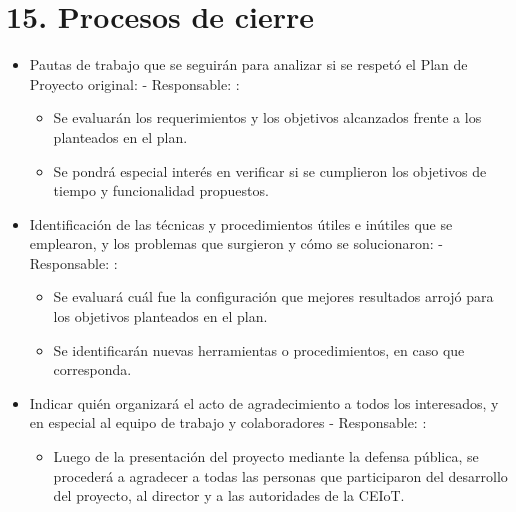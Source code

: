 \documentclass[
11pt, %
]{charter}
\begin{document}
\section{15. Procesos de cierre} 
\label{sec:cierre}

\begin{itemize}
	\item Pautas de trabajo que se seguirán para analizar si se respetó el Plan de Proyecto original:
	 - Responsable: \authorname:
	\begin{itemize}			
		\item Se evaluarán los requerimientos y los objetivos alcanzados frente a los planteados en el plan.
		\item Se pondrá especial interés en verificar si se cumplieron los objetivos de tiempo y funcionalidad propuestos.
	\end{itemize}	    	
	
	\item Identificación de las técnicas y procedimientos útiles e inútiles que se emplearon, y los problemas que surgieron y cómo se solucionaron:
	 - Responsable: \authorname:
	\begin{itemize}			
		\item Se evaluará cuál fue la configuración que mejores resultados arrojó para los objetivos planteados en el plan.
		\item Se identificarán nuevas herramientas o procedimientos, en caso que corresponda.
	\end{itemize}	    	
	
	\item Indicar quién organizará el acto de agradecimiento a todos los interesados, y en especial al equipo de trabajo y colaboradores - Responsable: \authorname :
	\begin{itemize}			
		\item Luego de la presentación del proyecto mediante la defensa pública, se procederá a agradecer a todas las personas que participaron del desarrollo del proyecto, al director y a las autoridades de la CEIoT.
	\end{itemize}	
\end{itemize}
\end{document}
